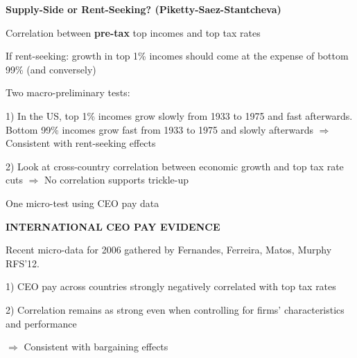 \documentclass[landscape]{slides}
\begin{document}
\begin{slide}

\end{slide}

\begin{slide}
\begin{center}
{\bf Supply-Side or Rent-Seeking? (Piketty-Saez-Stantcheva)}
\end{center}
Correlation between \textbf{pre-tax} top incomes and top tax rates

If rent-seeking: growth in top 1\% incomes should come at the expense of
bottom 99\% (and conversely)

Two macro-preliminary tests:

1) In the US, top 1\% incomes grow slowly from 1933 to 1975 and fast afterwards.
Bottom 99\% incomes grow fast from 1933 to 1975 and slowly afterwards
$\Rightarrow$ Consistent with rent-seeking effects

2) Look at cross-country correlation between economic growth and top tax rate cuts
$\Rightarrow$ No correlation supports trickle-up 

One micro-test using CEO pay data

\end{slide}

\begin{slide}

\end{slide}


%
%
%
%

\begin{slide}
\begin{center}
{\bf INTERNATIONAL CEO PAY EVIDENCE}
\end{center}
Recent micro-data for 2006 gathered by Fernandes, Ferreira, Matos, Murphy RFS'12. 

1) CEO pay across countries strongly negatively correlated with top tax rates

2) Correlation remains as strong even when controlling for firms' characteristics
and performance 

$\Rightarrow$ Consistent with bargaining effects

\end{slide}
\end{document}
